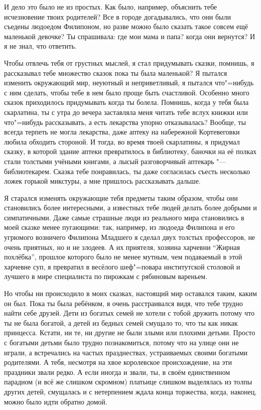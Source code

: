 И дело это было не из простых.
Как было, например, объяснить тебе исчезновение твоих родителей?
Все в городе догадывались, что они были съедены людоедом Филипоном, но разве
можно было сказать такое совсем ещё маленькой девочке?
Ты спрашивала: где мои мама и папа?
когда они вернутся?
И я не знал, что ответить.

Чтобы отвлечь тебя от грустных мыслей, я стал придумывать сказки, помнишь, я
рассказывал тебе множество сказок пока ты была маленькой?
Я пытался изменить окружающий мир, неуютный и неприветливый, я пытался
что"=нибудь с ним сделать, чтобы тебе в нем было проще быть счастливой.
Особенно много сказок приходилось придумывать когда ты болела.
Помнишь, когда у тебя была скарлатина, ты с утра до вечера заставляла меня
читать тебе вслух книжки или что"=нибудь рассказывать, а есть лекарства упорно
отказывалась?
Вообще, ты всегда терпеть не могла лекарства, даже аптеку на набережной
Кортевеговки любила обходить стороной.
И тогда, во время твоей скарлатины, я придумал сказку, в которой здание аптеки
превратилось в библиотеку, баночки на её полках стали толстыми учёными книгами,
а лысый разговорчивый аптекарь "--- библиотекарем.
Сказка тебе понравилась, ты даже согласилась съесть несколько ложек горькой
микстуры, а мне пришлось рассказывать дальше.

Я старался изменять окружающие тебя предметы таким образом, чтобы они
становились более интересными, а известных тебе людей делать более добрыми и
симпатичными.
Даже самые страшные люди из реального мира становились в моей сказке менее
пугающими: так, например, из людоеда Филипона и его угрюмого возничего Филипона
Младшего я сделал двух толстых профессоров, не очень приятных, но и не злодеев.
А их приятеля, хозяина харчевни \enquote{Жирная похлёбка}, прошлое которого было
не менее мутным, чем подаваемый в этой харчевне суп, я превратил в весёлого
шеф"=повара институтской столовой и лучшего в мире специалиста по пирожкам с
рябиновым вареньем.

Но чтобы ни происходило в моих сказках, настоящий мир оставался таким, каким он
был.
Пока ты была ребёнком, я очень расстраивался видя, что тебе трудно найти себе
друзей.
Дети из богатых семей не хотели с тобой дружить потому что ты не была богатой, а
детей из бедных семей смущало то, что ты как никак принцесса.
Кстати, ни те, ни другие не были злыми или плохими детьми.
Просто с богатыми детьми было трудно познакомиться, потому что на улице они не
играли, а встречались на частых празднествах, устраиваемых своими богатыми
родителями.
А тебя, несмотря на хвое королевское происхождение, на эти праздники звали редко.
А если иногда и звали, ты, в своём единственном парадном (и всё же слишком
скромном) платьице слишком выделялась из толпы других детей, смущалась и с
нетерпением ждала конца торжества, когда, наконец, можно было идти обратно домой.

